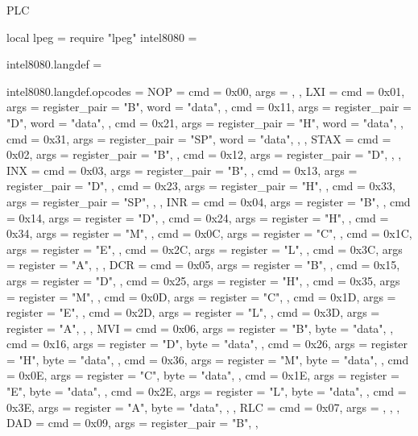\startenvironment PLC

\startluacode

local lpeg = require "lpeg"
intel8080 = {}

intel8080.langdef = {}

intel8080.langdef.opcodes = {
    NOP  = {
        {cmd = 0x00, args = {}},
    },
    LXI  = {
        { cmd = 0x01, args = {{register_pair = "B"},  {word = "data"}}, },
        { cmd = 0x11, args = {{register_pair = "D"},  {word = "data"}}, },
        { cmd = 0x21, args = {{register_pair = "H"},  {word = "data"}}, },
        { cmd = 0x31, args = {{register_pair = "SP"}, {word = "data"}}, },
    },
    STAX = {
        { cmd = 0x02, args = {{register_pair = "B"}}, },
        { cmd = 0x12, args = {{register_pair = "D"}}, },
    },
    INX  = {
        { cmd = 0x03, args = {{register_pair = "B"}}, },
        { cmd = 0x13, args = {{register_pair = "D"}}, },
        { cmd = 0x23, args = {{register_pair = "H"}}, },
        { cmd = 0x33, args = {{register_pair = "SP"}}, },
    },
    INR  = {
        { cmd = 0x04, args = {{register = "B"}}, },
        { cmd = 0x14, args = {{register = "D"}}, },
        { cmd = 0x24, args = {{register = "H"}}, },
        { cmd = 0x34, args = {{register = "M"}}, },
        { cmd = 0x0C, args = {{register = "C"}}, },
        { cmd = 0x1C, args = {{register = "E"}}, },
        { cmd = 0x2C, args = {{register = "L"}}, },
        { cmd = 0x3C, args = {{register = "A"}}, },
    },
    DCR  = {
        { cmd = 0x05, args = {{register = "B"}}, },
        { cmd = 0x15, args = {{register = "D"}}, },
        { cmd = 0x25, args = {{register = "H"}}, },
        { cmd = 0x35, args = {{register = "M"}}, },
        { cmd = 0x0D, args = {{register = "C"}}, },
        { cmd = 0x1D, args = {{register = "E"}}, },
        { cmd = 0x2D, args = {{register = "L"}}, },
        { cmd = 0x3D, args = {{register = "A"}}, },
    },
    MVI  = {
        { cmd = 0x06, args = {{register = "B"}, {byte = "data"}}, },
        { cmd = 0x16, args = {{register = "D"}, {byte = "data"}}, },
        { cmd = 0x26, args = {{register = "H"}, {byte = "data"}}, },
        { cmd = 0x36, args = {{register = "M"}, {byte = "data"}}, },
        { cmd = 0x0E, args = {{register = "C"}, {byte = "data"}}, },
        { cmd = 0x1E, args = {{register = "E"}, {byte = "data"}}, },
        { cmd = 0x2E, args = {{register = "L"}, {byte = "data"}}, },
        { cmd = 0x3E, args = {{register = "A"}, {byte = "data"}}, },
    },
    RLC  = {
        { cmd = 0x07, args = {}, },
    },
    DAD  = {
        { cmd = 0x09, args = {{register_pair = "B"}}, },
}}
